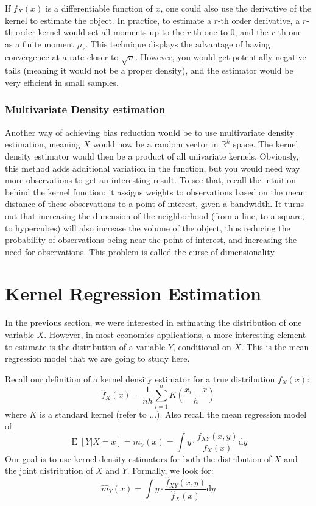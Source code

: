 \documentclass[12pt]{report}
\def\D{\mathrm{d}}
\newcommand{\E}[1]{\operatorname{E}\left[#1\right]}
\def\D{\mathrm{d}}
\def\D{\mathrm{d}}
\begin{document}
If $f_X(x)$ is a differentiable function of $x$, one could also use the derivative of the kernel to estimate the object. In practice, to estimate a $r$-th order derivative, a $r$-th order kernel would set all moments up to the $r$-th one to 0, and the $r$-th one as a finite moment $\mu_r$. This technique displays the advantage of having convergence at a rate closer to $\sqrt{n}$. However, you would get potentially negative tails (meaning it would not be a proper density), and the estimator would be very efficient in small samples.

\subsubsection{Multivariate Density estimation}

Another way of achieving bias reduction would be to use multivariate density estimation, meaning $X$ would now be a random vector in $\mathbb{R}^k$ space. The kernel density estimator would then be a product of all univariate kernels. Obviously, this method adds additional variation in the function, but you would need way more observations to get an interesting result. To see that, recall the intuition behind the kernel function: it assigns weights to observations based on the mean distance of these observations to a point of interest, given a bandwidth. It turns out that increasing the dimension of the neighborhood (from a line, to a square, to hypercubes) will also increase the volume of the object, thus reducing the probability of observations being near the point of interest, and increasing the need for observations. This problem is called the curse of dimensionality.

\section{Kernel Regression Estimation}

In the previous section, we were interested in estimating the distribution of one variable $X$. However, in most economics applications, a more interesting element to estimate is the distribution of a variable $Y$, conditional on $X$. This is the mean regression model that we are going to study here.

Recall our definition of a kernel density estimator for a true distribution $f_X(x)$: $$ \hat f_X(x) = \frac{1}{nh} \sum_{i=1}^{n} K\left(\frac{x_i - x}{h}\right) $$ where $K$ is a standard kernel (refer to ...). Also recall the mean regression model of $$\E{Y\vert X = x} = m_Y(x) = \int y\cdot \frac{f_{XY}(x, y)}{f_X(x)}\D y $$ Our goal is to use kernel density estimators for both the distribution of $X$ and the joint distribution of $X$ and $Y$. Formally, we look for: $$ \hat m_Y(x) = \int y\cdot \frac{\hat f_{XY}(x, y)}{\hat f_X(x)}\D y $$ 
\end{document}
